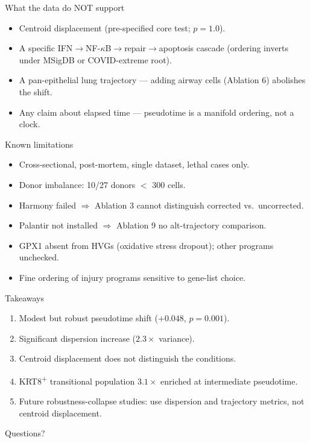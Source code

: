 \documentclass[aspectratio=169]{beamer}
\begin{document}
\begin{frame}{What the data do NOT support}
\begin{itemize}
  \item Centroid displacement (pre-specified core test; $p=1.0$).
  \item A specific IFN$\rightarrow$NF-$\kappa$B$\rightarrow$repair$\rightarrow$apoptosis cascade (ordering inverts under MSigDB or COVID-extreme root).
  \item A pan-epithelial lung trajectory --- adding airway cells (Ablation 6) abolishes the shift.
  \item Any claim about elapsed time --- pseudotime is a manifold ordering, not a clock.
\end{itemize}
\end{frame}

\begin{frame}{Known limitations}
\begin{itemize}
  \item Cross-sectional, post-mortem, single dataset, lethal cases only.
  \item Donor imbalance: 10/27 donors $<$ 300 cells.
  \item Harmony failed $\Rightarrow$ Ablation 3 cannot distinguish corrected vs.\ uncorrected.
  \item Palantir not installed $\Rightarrow$ Ablation 9 no alt-trajectory comparison.
  \item GPX1 absent from HVGs (oxidative stress dropout); other programs unchecked.
  \item Fine ordering of injury programs sensitive to gene-list choice.
\end{itemize}
\end{frame}

\begin{frame}{Takeaways}
\begin{enumerate}
  \item Modest but robust pseudotime shift ($+0.048$, $p=0.001$).
  \item Significant dispersion increase ($2.3\times$ variance).
  \item Centroid displacement does not distinguish the conditions.
  \item KRT8\textsuperscript{+} transitional population $3.1\times$ enriched at intermediate pseudotime.
  \item Future robustness-collapse studies: use dispersion and trajectory metrics, not centroid displacement.
\end{enumerate}
\end{frame}

\begin{frame}[standout]
Questions?
\end{frame}
\end{document}
